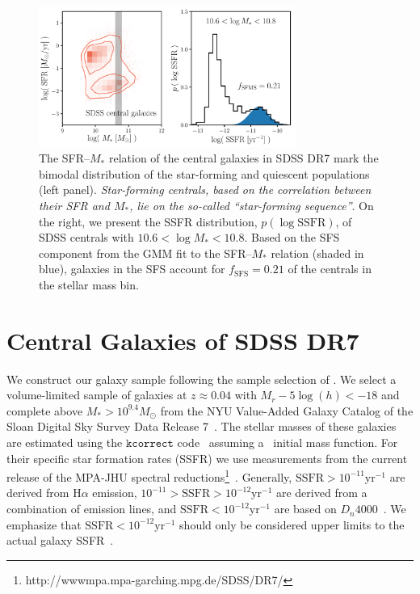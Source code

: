 \documentclass[12pt, letterpaper, preprint, tighten]{aastex62}
\begin{document}
\begin{figure}
\begin{center}
\includegraphics[width=0.75\textwidth]{figs/groupcat.pdf}
    \caption{The SFR--$M_*$ relation of the central galaxies in SDSS DR7 
    mark the bimodal distribution of the star-forming and quiescent 
    populations (left panel). \emph{Star-forming centrals, based on the correlation between their 
    SFR and $M_*$, lie on the so-called ``star-forming sequence''}.
    On the right, we present the SSFR distribution, $p(\log\mathrm{SSFR})$, 
    of SDSS centrals with $10.6 < \log M_* < 10.8$. Based on the SFS component
    from the \cite{hahn2018a} GMM fit to the SFR--$M_*$ relation (shaded in blue), 
    galaxies in the SFS account for $f_\mathrm{SFS} = 0.21$ of the centrals 
    in the stellar mass bin.} \label{fig:groupcat}
\end{center}
\end{figure}

\section{Central Galaxies of SDSS DR7} \label{sec:sdss}
We construct our galaxy sample following the sample selection of \cite{tinker2011}. 
We select a volume-limited sample of galaxies at $z \approx 0.04$ with 
$M_r - 5 \log(h) < -18$ and complete above $M_* > 10^{9.4} M_\odot$ from 
the NYU Value-Added Galaxy Catalog \citep[VAGC;][]{blanton2005} of the 
Sloan Digital Sky Survey Data Release 7~\citep[SDSS DR7;][]{abazajian2009}. 
The stellar masses of these galaxies are estimated using the
$\mathtt{kcorrect}$ code~\citep{blanton2007} assuming a~\cite{chabrier2003} 
initial mass function. For their specific star formation rates (SSFR) we use 
measurements from the current release of the MPA-JHU spectral 
reductions\footnote{http://wwwmpa.mpa-garching.mpg.de/SDSS/DR7/}~\citep{brinchmann2004}.
Generally, $\mathrm{SSFR} > 10^{-11}\mathrm{yr}^{-1}$ are derived from 
$\mathrm{H}\alpha$ emission, $10^{-11} > \mathrm{SSFR} > 10^{-12}\mathrm{yr}^{-1}$
are derived from a combination of emission lines, and $\mathrm{SSFR} < 10^{-12}\mathrm{yr}^{-1}$
are based on $D_n 4000$~\citep[see discussion in][]{wetzel2013}. We emphasize that 
$\mathrm{SSFR} < 10^{-12}\mathrm{yr}^{-1}$ should only be considered upper limits 
to the actual galaxy SSFR~\citep{salim2007}.
\end{document}
